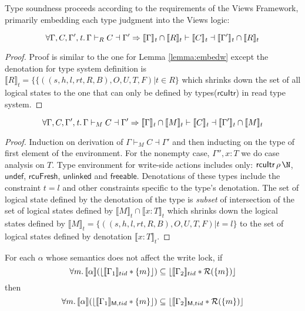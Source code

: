 Type soundness proceeds according to the requirements of the Views Framework, primarily embedding each type judgment into the Views logic:
\begin{lemma}\label{lemma:embedr}
\[  \forall\Gamma,C,\Gamma',\mathit{t}\ldotp\Gamma\vdash_R C\dashv \Gamma' \Rightarrow
\llbracket\Gamma\rrbracket_\mathit{t}\cap\llbracket{R}\rrbracket_t\vdash \llbracket C\rrbracket_\mathit{t}\dashv\llbracket\Gamma'\rrbracket_\mathit{t}\cap\llbracket{R}\rrbracket_t
\]
\end{lemma}
\begin{proof}
  Proof is similar to the one for Lemma \ref{lemma:embedw} except the denotation for type system definition is $\llbracket R \rrbracket_t = \{\{((s,h,l,rt,R,B),O,U,T,F)| t \in R \}$ which shrinks down the set of all logical states to the one that can only be defined by types($\textsf{rcuItr}$) in read type system. 
  \end{proof}
\begin{lemma}\label{lemma:embedw}
  \[
\forall\Gamma,C,\Gamma',\mathit{t}\ldotp\Gamma\vdash_M C\dashv \Gamma' \Rightarrow
\llbracket\Gamma\rrbracket_\mathit{t}\cap\llbracket{M}\rrbracket_t\vdash \llbracket C\rrbracket_\mathit{t}\dashv\llbracket\Gamma'\rrbracket_\mathit{t}\cap\llbracket{M}\rrbracket_t
\]
\end{lemma}
\begin{proof}
  Induction on derivation of $\Gamma \vdash_M C \dashv \Gamma'$ and then inducting on the type of first element of the environment. For the nonempty case, $\Gamma'',x:T$ we do case analysis on $T$. Type environment for write-side actions includes only: $\textsf{rcuItr} \, \rho \, \N$, $\textsf{undef}$, $\textsf{rcuFresh}$, $\textsf{unlinked}$ and $\textsf{freeable}$. Denotations of these types include the constraint $t=l$ and other constraints specific to the type's denotation. The set of logical state defined by the denotation of the type is \emph{subset} of intersection of the set of logical states defined by $\llbracket M \rrbracket_{t} \cap \llbracket x:T \rrbracket_{t}$ which shrinks down the logical states defined by  $\llbracket M \rrbracket_{t}= \{((s,h,l,rt,R,B),O,U,T,F)| t = l\}$ to the set of logical states defined by denotation $\llbracket x:T \rrbracket_t$.
  \end{proof}
\begin{lemma}
\label{lem:crit-lifting}
For each $\alpha$ whose semantics does not affect the write lock, if
\[\forall m\ldotp   \llbracket \alpha \rrbracket  (\lfloor \llbracket \Gamma_{1} \rrbracket_{tid}  * \{m\} \rfloor )\subseteq  \lfloor \llbracket \Gamma_{2} \rrbracket_{tid} * \mathcal{R}(\{m\}) \rfloor\]
then
\[\forall m\ldotp   \llbracket \alpha \rrbracket  (\lfloor \llbracket \Gamma_{1} \rrbracket_{\textsf{M},tid}  * \{m\} \rfloor )\subseteq  \lfloor \llbracket \Gamma_{2} \rrbracket_{\textsf{M},tid} * \mathcal{R}(\{m\}) \rfloor\]
\end{lemma}
